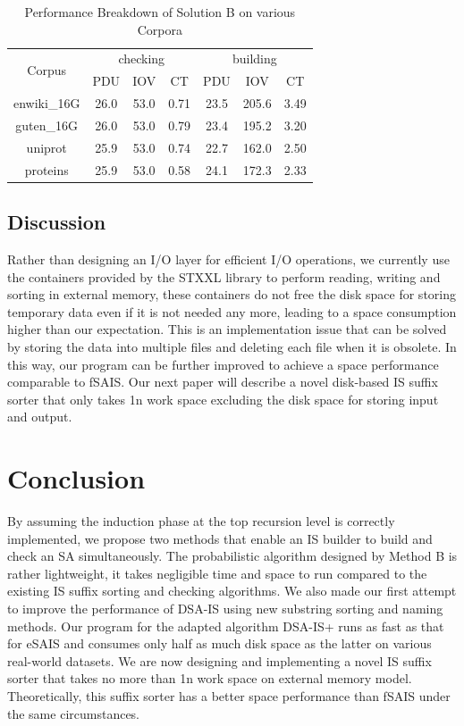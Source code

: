 \documentclass[10pt,journal,compsoc]{IEEEtran}
\begin{document}
\begin{table}%
	\caption{Performance Breakdown of Solution B on various Corpora}
	\label{tbl:breakdown_solutionb}
	\centering
	\begin{tabular}{|c|c|c|c|c|c|c|}
		\hline
		\multirow{2}{*}{Corpus} & \multicolumn{3}{|c}{checking} & \multicolumn{3}{|c|}{building} \\\cline{2-7}
		& PDU & IOV & CT & PDU & IOV & CT \\\hline
		enwiki\_16G & 26.0 & 53.0 & 0.71 & 23.5 & 205.6 & 3.49 \\\hline
		guten\_16G & 26.0 & 53.0 & 0.79 & 23.4 & 195.2 & 3.20 \\\hline
		uniprot & 25.9 & 53.0 & 0.74 & 22.7 & 162.0 & 2.50 \\\hline
		proteins & 25.9 & 53.0 & 0.58 & 24.1 & 172.3 & 2.33 \\\hline
	\end{tabular}
\end{table}%

\subsection{Discussion}

Rather than designing an I/O layer for efficient I/O operations, we currently use the containers provided by the STXXL library to perform reading, writing and sorting in external memory, these containers do not free the disk space for storing temporary data even if it is not needed any more, leading to a space consumption higher than our expectation. This is an implementation issue that can be solved by storing the data into multiple files and deleting each file when it is obsolete. In this way, our program can be further improved to achieve a space performance comparable to fSAIS. Our next paper will describe a novel disk-based IS suffix sorter that only takes 1n work space excluding the disk space for storing input and output. 

\section{Conclusion} \label{sec:conclusion}

By assuming the induction phase at the top recursion level is correctly implemented, we propose two methods that enable an IS builder to build and check an SA simultaneously. The probabilistic algorithm designed by Method B is rather lightweight, it takes negligible time and space to run compared to the existing IS suffix sorting and checking algorithms. We also made our first attempt to improve the performance of DSA-IS using new substring sorting and naming methods. Our program for the adapted algorithm DSA-IS+ runs as fast as that for eSAIS and consumes only half as much disk space as the latter on various real-world datasets. We are now designing and implementing a novel IS suffix sorter that takes no more than 1n work space on external memory model. Theoretically, this suffix sorter has a better space performance than fSAIS under the same circumstances. 



\end{document}
